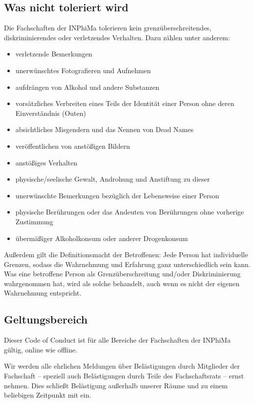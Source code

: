 \documentclass{article}
\begin{document}
\subsection{Was nicht toleriert wird}
Die Fachschaften der INPhiMa tolerieren kein grenzüberschreitendes, diskriminierendes oder verletzendes Verhalten. Dazu zählen unter anderem:
\begin{itemize}
    \item verletzende Bemerkungen
    \item unerwünschtes Fotografieren und Aufnehmen
    \item aufdrängen von Alkohol und andere Substanzen
    \item vorsätzliches Verbreiten eines Teils der Identität einer Person ohne deren Einverständnis (Outen)
    \item absichtliches Misgendern und das Nennen von Dead Names
    \item veröffentlichen von anstößigen Bildern
    \item anstößiges Verhalten
    \item physische/seelische Gewalt, Androhung und Anstiftung zu dieser
    \item unerwünschte Bemerkungen bezüglich der Lebensweise einer Person
    \item physische Berührungen oder das Andeuten von Berührungen ohne vorherige Zustimmung
    \item übermäßiger Alkoholkonsum oder anderer Drogenkonsum
\end{itemize}

Außerdem gilt die Definitionsmacht der Betroffenen: Jede Person hat individuelle Grenzen, sodass die Wahrnehmung und Erfahrung ganz unterschiedlich sein kann. Was eine betroffene Person als Grenzüberschreitung und/oder Diskriminierung wahrgenommen hat, wird als solche behandelt, auch wenn es nicht der eigenen Wahrnehmung entspricht.

\subsection{Geltungsbereich}
Dieser Code of Conduct ist für alle Bereiche der Fachschaften der INPhiMa gültig, online wie offline.

Wir werden alle ehrlichen Meldungen über Belästigungen durch Mitglieder der Fachschaft – speziell auch Belästigungen durch Teile des Fachschaftsrats – ernst nehmen. Dies schließt Belästigung außerhalb unserer Räume und zu einem beliebigen Zeitpunkt mit ein.
\end{document}
